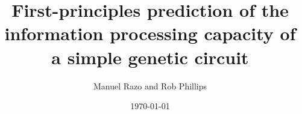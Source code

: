 



\newcommand{\mrm}[1]{\textcolor{ForestGreen}{(MR:~#1)}} %
\newcommand{\rp}[1]{\textcolor{red}{(RP:~#1)}} %

\newcommand{\captionStroke}[1]{\textbf{#1}}

\usepackage{xparse}

\DeclareDocumentCommand {}
{}

\DeclareDocumentCommand {}
{}

\newcommand{\letter}[1]{#1} %
\newcommand{\letterParen}[1]{(#1)} %

\title{\textbf{First-principles prediction of the information processing
capacity of a simple genetic circuit}}
\author{Manuel Razo and Rob Phillips}
\date{\today}


\maketitle
	
%	
	
	


